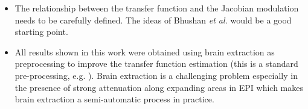 {\begin{itemize}
    \item{The relationship between the transfer function and the Jacobian modulation needs to be carefully defined. The ideas of Bhushan {\it et al.} \cite{Bhushan2015} would be a good starting point.}
	\item{All results shown in this work were obtained using brain extraction as preprocessing to improve the transfer function estimation (this is a standard pre-processing, e.g. \cite{Bhushan2015}). Brain extraction is a challenging problem especially in the presence of strong attenuation along expanding areas in EPI which makes brain extraction a semi-automatic process in practice.}
\end{itemize}}





